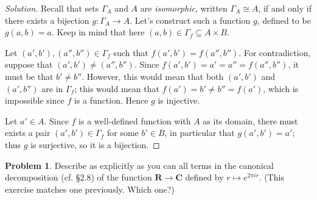 \documentclass[fontsize=14pt]{scrartcl}
\theoremstyle{definition}
\newtheorem{problem-internal}{Problem}[subsection]
\newenvironment{problem}{
  \medskip
  \begin{problem-internal}
}{
  \end{problem-internal}
}
\newenvironment{solution}{
  \begin{proof}[Solution]
  \vspace{-8px}
  \setlength{\parskip}{4px}
  \setlength{\parindent}{0px}
}{
  \end{proof}
}
\begin{document}
\begin{solution}
Recall that sets $\Gamma_A$ and $A$ are \textit{isomorphic}, written
$\Gamma_A\cong A$, if and only if there exists a bijection $g:\Gamma_A\to A$.
Let's construct such a function $g$, defined to be $g(a,b) = a$. Keep in mind
that here $(a,b)\in\Gamma_f\subseteq A\times B$.

Let $(a',b'),(a'',b'')\in\Gamma_f$ such that $f(a',b') = f(a'',b'')$. For
contradiction, suppose that $(a',b')\neq (a'',b'')$. Since $f(a',b') = a' = a''
= f(a'',b'')$, it must be that $b'\neq b''$. However, this would mean that both
$(a',b')$ and $(a',b'')$ are in $\Gamma_f$; this would mean that $f(a') = b'
\neq b'' = f(a')$, which is impossible since $f$ is a function. Hence $g$ is
injective.

Let $a'\in A$. Since $f$ is a well-defined function with $A$ as its domain,
there must exists a pair $(a',b')\in\Gamma_f$ for some $b'\in B$, in particular
that $g(a',b') = a'$; thus $g$ is surjective, so it is a bijection.
\end{solution}


\begin{problem}
Describe as explicitly as you can all terms in the canonical decomposition (cf.
\S2.8) of the function $\mathbf{R}\to\mathbf{C}$ defined by $r\mapsto e^{2\pi
ir}$. (This exercise matches one previously. Which one?)
\end{problem}
\end{document}
